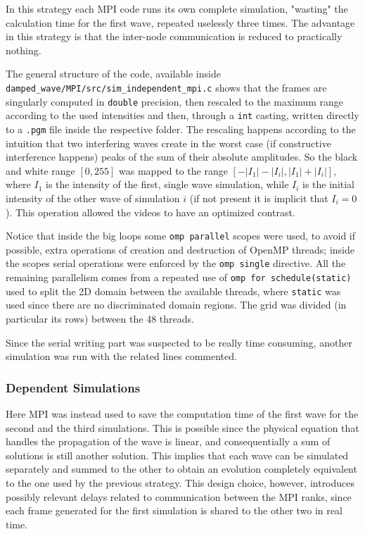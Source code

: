 In this strategy each MPI code runs its own complete simulation,
"wasting" the calculation time
for the first wave, repeated uselessly three times. The advantage in
this strategy is that
the inter-node communication is reduced to practically nothing.

The general structure of the code, available inside
\lstinline[language=bash,
  basicstyle=\ttfamily\color{black},
  identifierstyle=\color{black},
  keywordstyle=\color{black},
  commentstyle=\color{black},
  stringstyle=\color{black},
  numberstyle=\color{black},
]|damped_wave/MPI/src/sim_independent_mpi.c| shows that the frames
are singularly computed
in \texttt{double} precision, then rescaled to the maximum range
according to the
used intensities and then, through a \texttt{int} casting, written
directly to a \texttt{.pgm} file inside the respective folder.
The rescaling happens according to the intuition that two interfering
waves create in the worst case
(if constructive interference happens) peaks of the sum of their
absolute amplitudes.
So the black and white range $[0,255]$ was mapped to
the range $[-|I_1| -|I_i|, |I_1|+ |I_i|]$, where $I_1$ is the intensity of the
first, single wave simulation, while $I_i$ is the initial intensity
of the other wave of
simulation $i$ (if not present it is implicit that $I_i = 0$).
This operation allowed the videos to have an optimized contrast.

Notice that inside the big loops some \texttt{omp parallel} scopes
were used, to avoid if
possible, extra operations of creation and destruction of OpenMP threads;
inside the scopes serial operations were enforced by the \texttt{omp single}
directive. All the remaining parallelism comes from a repeated use of
\texttt{omp for schedule(static)} used to split the 2D domain between
the available threads,
where \texttt{static} was used since there are no discriminated domain regions.
The grid was divided (in particular its rows) between the 48 threads.

Since the serial writing part was suspected to be really time
consuming, another simulation
was run with the related lines commented.
\subsubsection{Dependent Simulations}

Here MPI was instead used to save the computation time of the first wave
for the second and the third simulations. This is possible since the
physical equation that handles the propagation of the wave is linear, and
consequentially a sum of solutions is still another solution. This implies that
each wave can be simulated separately and summed to the other to
obtain an evolution
completely equivalent to the one used by the previous strategy.
This design choice, however, introduces possibly relevant delays
related to communication between
the MPI ranks, since each frame generated for the first simulation is
shared to the other two in real time.

